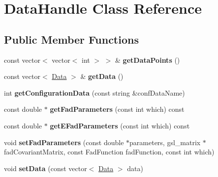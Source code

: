 \hypertarget{classDataHandle}{\section{Data\-Handle Class Reference}
\label{classDataHandle}
}
\subsection*{Public Member Functions}
\begin{DoxyCompactItemize}
\item 
\hypertarget{classDataHandle_ae1667fdd8c3e7dc4f949b828302fee0a}{const vector$<$ vector$<$ int $>$ $>$ \& {\bfseries get\-Data\-Points} ()}\label{classDataHandle_ae1667fdd8c3e7dc4f949b828302fee0a}

\item 
\hypertarget{classDataHandle_a0c73485b27cb84a81e8ce8687cadb0be}{const vector$<$ \hyperlink{classData}{Data} $>$ \& {\bfseries get\-Data} ()}\label{classDataHandle_a0c73485b27cb84a81e8ce8687cadb0be}

\item 
\hypertarget{classDataHandle_a6fa18d21b416a4a878734fdf80a51161}{int {\bfseries get\-Configuration\-Data} (const string \&conf\-Data\-Name)}\label{classDataHandle_a6fa18d21b416a4a878734fdf80a51161}

\item 
\hypertarget{classDataHandle_ae851018a34b27dd9864707078b3658a5}{const double $\ast$ {\bfseries get\-Fad\-Parameters} (const int which) const }\label{classDataHandle_ae851018a34b27dd9864707078b3658a5}

\item 
\hypertarget{classDataHandle_a39aa5ab26ae6cdad163aeede417ca7b8}{const double $\ast$ {\bfseries get\-E\-Fad\-Parameters} (const int which) const }\label{classDataHandle_a39aa5ab26ae6cdad163aeede417ca7b8}

\item 
\hypertarget{classDataHandle_a0409902e4f2fad832cca5f313db34ee0}{void {\bfseries set\-Fad\-Parameters} (const double $\ast$parameters, gsl\-\_\-matrix $\ast$fad\-Covariant\-Matrix, const Fad\-Function fad\-Function, const int which)}\label{classDataHandle_a0409902e4f2fad832cca5f313db34ee0}

\item 
\hypertarget{classDataHandle_ac6ff603576fc66ad42fa713109e046ae}{void {\bfseries set\-Data} (const vector$<$ \hyperlink{classData}{Data} $>$ data)}\label{classDataHandle_ac6ff603576fc66ad42fa713109e046ae}


\end{DoxyCompactItemize}

